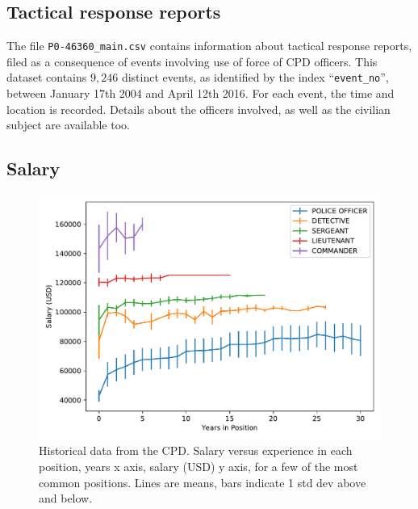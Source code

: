 \subsection{Tactical response reports}

The file \texttt{P0-46360\_main.csv} contains information about tactical response reports, filed as a consequence of  events involving use of force of CPD officers. This dataset contains $9{,}246$ distinct events, as identified by the index ``\texttt{event\_no}'', between January 17th 2004 and April 12th 2016. For each event, the time and location is recorded. Details about the officers involved, as well as the civilian subject are available too. 

\subsection{Salary}

\begin{figure}[h] 
\includegraphics[width=\textwidth]{figs/salary} 
\caption{Historical data from the CPD. Salary versus experience in each
position, years x axis, salary (USD) y axis, for a few of the most common
positions. Lines are means, bars indicate 1 std dev above and below.} \label{fig:salary}
\end{figure}

